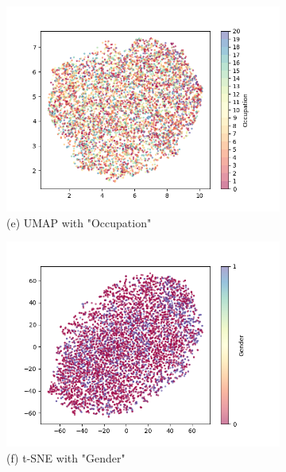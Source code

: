 \documentclass{article}
\begin{document}
\begin{figure}[H]
\begin{subfigure}{0.49\textwidth}
        \includegraphics[width=\textwidth]{fig/umap_occ.png}
        \caption*{(e) UMAP with "Occupation"}
    \end{subfigure}
    \begin{subfigure}{0.49\textwidth}
        \includegraphics[width=\textwidth]{fig/tsne_gender.png}
        \caption*{(f) t-SNE with "Gender"}
    \end{subfigure}
    \begin{subfigure}{0.49\textwidth}

\end{subfigure}
\end{figure}
\end{document}
